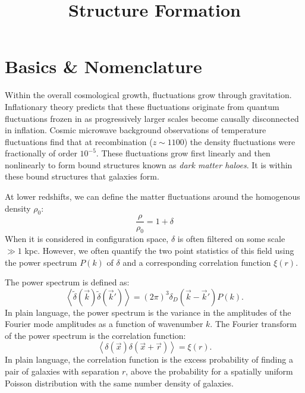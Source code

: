 \title{\bf Structure Formation}

\section{Basics \& Nomenclature}

Within the overall cosmological growth, fluctuations grow through
gravitation. Inflationary theory predicts that these fluctuations
originate from quantum fluctuations frozen in as progressively larger
scales become causally disconnected in inflation. Cosmic microwave
background observations of temperature fluctuations find that at
recombination ($z\sim 1100$) the density fluctuations were
fractionally of order $10^{-5}$. These fluctuations grow first
linearly and then nonlinearly to form bound structures known as {\it
  dark matter haloes}. It is within these bound structures that
galaxies form.

At lower redshifts, we can define the matter fluctuations around the
homogenous density $\rho_0$:
\begin{equation}
\frac{\rho}{\rho_0} = 1+ \delta
\end{equation}
When it is considered in configuration space, $\delta$ is often
filtered on some scale $\gg 1$ kpc.  However, we often quantify the
two point statistics of this field using the power spectrum $P(k)$ of
$\delta$ and a corresponding correlation function $\xi(r)$.

The power spectrum is defined as:
\begin{equation}
\left\langle \tilde\delta(\vec{k}) \tilde\delta(\vec{k}') \right\rangle
= (2\pi)^3 \delta_D\left(\vec{k} - \vec{k}'\right) P(k).
\end{equation}
In plain language, the power spectrum is the variance in the
amplitudes of the Fourier mode amplitudes as a function of wavenumber
$k$. The Fourier transform of the power spectrum is the correlation
function:
\begin{equation}
\left\langle\delta\left(\vec{x}\right) \delta\left(\vec{x}
+ \vec{r} \right) \right\rangle = \xi(r).
\end{equation}
In plain language, the correlation function is the excess probability
of finding a pair of galaxies with separation $r$, above the
probability for a spatially uniform Poisson distribution with the same
number density of galaxies.

